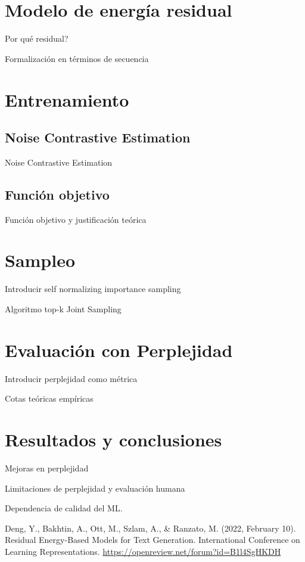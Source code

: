 \documentclass[letterpaper,11pt,oneside]{article}
\theoremstyle{break}
\begin{document}
\section{Modelo de energía residual}
Por qué residual?

Formalización en términos de secuencia

\lipsum[4]

\section{Entrenamiento}
\subsection{Noise Contrastive Estimation}
Noise Contrastive Estimation
\lipsum[5]

\subsection{Función objetivo}
Función objetivo y justificación teórica \lipsum[6]

\section{Sampleo}
Introducir self normalizing importance sampling

\lipsum[7]

Algoritmo top-k Joint Sampling

\lipsum[8]

\section{Evaluación con Perplejidad}
Introducir perplejidad como métrica

\lipsum[9]

Cotas teóricas empíricas

\lipsum[10]

\section{Resultados y conclusiones}
Mejoras en perplejidad
\lipsum[11]

Limitaciones de perplejidad y evaluación humana

Dependencia de calidad del ML.

\lipsum[12]

\iffalse
\section{Referencias}
\fi
\begin{references}
     Deng, Y., Bakhtin, A., Ott, M., Szlam, A., & Ranzato, M. (2022, February 10). Residual Energy-Based Models for Text Generation. International Conference on Learning Representations. \url{https://openreview.net/forum?id=B1l4SgHKDH}

\end{references}


\end{document}
